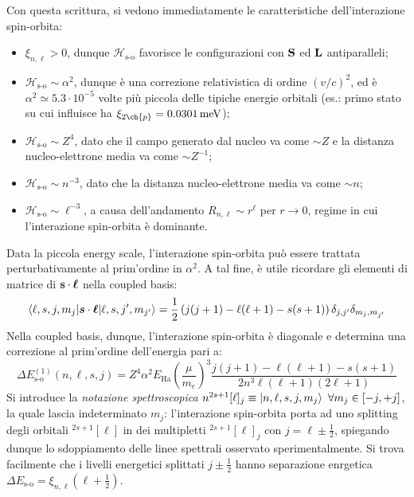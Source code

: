 Con questa scrittura, si vedono immediatamente le caratteristiche dell'interazione spin-orbita:
\begin{itemize}
	\item $ \xi_{n,\ell} > 0 $, dunque $ \mathcal{H}_\text{s-o} $ favorisce le configurazioni con $ \mathbf{S} $ ed $ \mathbf{L} $ antiparalleli;
	\item $ \mathcal{H}_\text{s-o} \sim \alpha^2 $, dunque è una correzione relativistica di ordine $ (v/c)^2 $, ed è $ \alpha^2 \simeq 5.3 \cdot 10^{-5} $ volte più piccola delle tipiche energie orbitali (es.: primo stato su cui influisce ha $ \xi_{2\ch{p}} = 0.0301 \,\text{meV} $);
	\item $ \mathcal{H}_\text{s-o} \sim Z^4 $, dato che il campo generato dal nucleo va come $ \sim Z $ e la distanza nucleo-elettrone media va come $ \sim Z^{-1} $;
	\item $ \mathcal{H}_\text{s-o} \sim n^{-3} $, dato che la distanza nucleo-elettrone media va come $ \sim n $;
	\item $ \mathcal{H}_\text{s-o} \sim \ell^{-3} $, a causa dell'andamento $ R_{n,\ell} \sim r^\ell $ per $ r \rightarrow 0 $, regime in cui l'interazione spin-orbita è dominante.
\end{itemize}
Data la piccola energy scale, l'interazione spin-orbita può essere trattata perturbativamente al prim'ordine in $ \alpha^2 $. A tal fine, è utile ricordare gli elementi di matrice di $ \mathbf{s} \cdot \boldsymbol{\ell} $ nella coupled basis:
\begin{equation}
	\braket{\ell,s,j,m_j | \boldsymbol{s} \cdot \boldsymbol{\ell} | \ell,s,j',m_{j'}} = \frac{1}{2} \left( j(j + 1) - \ell (\ell + 1) - s(s + 1) \right) \delta_{j,j'} \delta_{m_j, m_{j'}}
	\label{eq:sl-coupled-basis}
\end{equation}
Nella coupled basis, dunque, l'interazione spin-orbita è diagonale e determina una correzione al prim'ordine dell'energia pari a:
\begin{equation}
	\Delta E^{(1)}_\text{s-o}(n,\ell,s,j) = Z^4 \alpha^2 E_\text{Ha} \left( \frac{\mu}{m_e} \right)^3 \frac{j(j + 1) - \ell(\ell + 1) - s(s + 1)}{2n^3 \ell (\ell + 1) (2\ell + 1)}
	\label{eq:spin-orbit-spectr}
\end{equation}
Si introduce la \textit{notazione spettroscopica} $ n ^{2s+1} [\ell] _j \equiv \ket{n,\ell,s,j, m_j} \,\,\forall m_j \in [-j,+j] $, la quale lascia indeterminato $ m_j $: l'interazione spin-orbita porta ad uno splitting degli orbitali $ ^{2s+1}[\ell] $ in dei multipletti $ ^{2s+1}[\ell]_j $ con $ j = \ell \pm \frac{1}{2} $, spiegando dunque lo sdoppiamento delle linee spettrali osservato sperimentalmente. Si trova facilmente che i livelli energetici splittati $ j \pm \frac{1}{2} $ hanno separazione enrgetica $ \Delta E_\text{s-o} = \xi_{n,\ell} \left( \ell + \frac{1}{2} \right) $.

